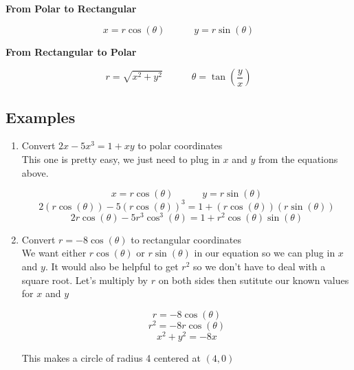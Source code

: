 \documentclass[12pt]{report}
\begin{document}
\begin{center}
\textbf{From Polar to Rectangular}
\end{center}
$$ x = r \cos(\theta) \quad \quad \quad y = r \sin(\theta) $$

\begin{center}
\textbf{From Rectangular to Polar}
\end{center}
$$ r = \sqrt{x^2 + y^2} \quad \quad \quad \theta = \tan \left( \frac{y}{x} \right) $$


\subsection*{Examples}
\begin{enumerate}
	\item Convert $2x - 5x^3 = 1 + xy$ to polar coordinates \\
	
	This one is pretty easy, we just need to plug in $x$ and $y$ from the equations above.
	
	$$ x = r \cos(\theta) \quad \quad \quad y = r \sin(\theta) $$
	$$ 2(r\cos(\theta)) - 5(r\cos(\theta))^3 = 1 + (r\cos(\theta))(r\sin(\theta)) $$
	$$ 2r\cos(\theta) - 5r^3\cos^3(\theta) = 1 + r^2\cos(\theta)\sin(\theta) $$
	
	\item Convert $r = -8\cos(\theta)$ to rectangular coordinates \\
	
	We want either $r\cos(\theta)$ or $r\sin(\theta)$ in our equation so we can plug in $x$ and $y$. It would also be helpful to get $r^2$ so we don't have to deal with a square root. Let's multiply by $r$ on both sides then sutitute our known values for $x$ and $y$
	
	$$ r = -8\cos(\theta) $$
	$$ r^2 = -8r\cos(\theta) $$
	$$ x^2 + y^2 = -8x$$
	
	This makes a circle of radius 4 centered at $(4,0)$
\end{enumerate}
















\clearpage
\end{document}
